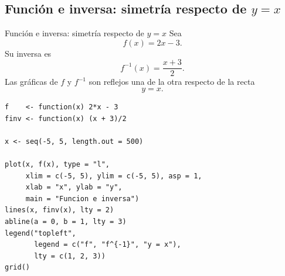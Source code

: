 \documentclass[aspectratio=169,10pt]{beamer}
\begin{document}
\subsection*{Función e inversa: simetría respecto de $y=x$}
\begin{frame}{Función e inversa: simetría respecto de $y=x$}
Sea
\[
f(x)=2x-3.
\]
Su inversa es
\[
f^{-1}(x)=\frac{x+3}{2}.
\]
Las gráficas de $f$ y $f^{-1}$ son reflejos una de la otra respecto de la
recta
\[
y=x.
\]

\begin{center}
\end{center}

\begin{verbatim}
f    <- function(x) 2*x - 3
finv <- function(x) (x + 3)/2

x <- seq(-5, 5, length.out = 500)

plot(x, f(x), type = "l",
     xlim = c(-5, 5), ylim = c(-5, 5), asp = 1,
     xlab = "x", ylab = "y",
     main = "Funcion e inversa")
lines(x, finv(x), lty = 2)
abline(a = 0, b = 1, lty = 3)
legend("topleft",
       legend = c("f", "f^{-1}", "y = x"),
       lty = c(1, 2, 3))
grid()
\end{verbatim}

\end{frame}
\end{document}
